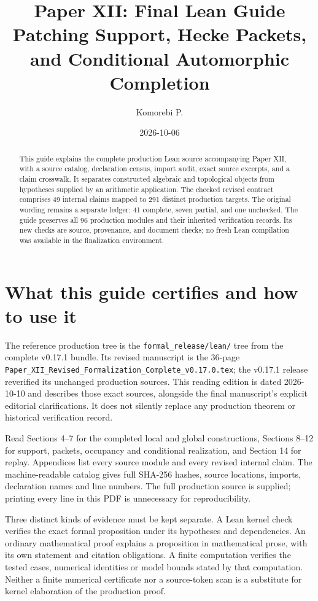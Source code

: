 \documentclass[11pt]{article}
\title{Paper XII: Final Lean Guide\\\large Patching Support, Hecke Packets, and Conditional Automorphic Completion}
\author{Komorebi P.}\date{2026-10-06}
\newcommand{\code}[1]{\nolinkurl{#1}}
\begin{document}
\KomorebiCover


\relax
\begin{abstract}
This guide explains the complete production Lean source accompanying Paper XII, with a source catalog, declaration census, import audit, exact source excerpts, and a claim crosswalk. It separates constructed algebraic and topological objects from hypotheses supplied by an arithmetic application. The checked revised contract comprises 49 internal claims mapped to 291 distinct production targets. The original wording remains a separate ledger: 41 complete, seven partial, and one unchecked. The guide preserves all 96 production modules and their inherited verification records. Its new checks are source, provenance, and document checks; no fresh Lean compilation was available in the finalization environment.
\end{abstract}
{\setlength{\parskip}{0pt}\linespread{1.0}\selectfont\tableofcontents}
\newpage

\section{What this guide certifies and how to use it}
The reference production tree is the \code{formal_release/lean/} tree from the complete v0.17.1 bundle. Its revised manuscript is the 36-page \code{Paper_XII_Revised_Formalization_Complete_v0.17.0.tex}; the v0.17.1 release reverified its unchanged production sources. This reading edition is dated 2026-10-10 and describes those exact sources, alongside the final manuscript's explicit editorial clarifications. It does not silently replace any production theorem or historical verification record.

Read Sections 4--7 for the completed local and global constructions, Sections 8--12 for support, packets, occupancy and conditional realization, and Section 14 for replay. Appendices list every source module and every revised internal claim. The machine-readable catalog gives full SHA-256 hashes, source locations, imports, declaration names and line numbers. The full production source is supplied; printing every line in this PDF is unnecessary for reproducibility.

Three distinct kinds of evidence must be kept separate. A Lean kernel check verifies the exact formal proposition under its hypotheses and dependencies. An ordinary mathematical proof explains a proposition in mathematical prose, with its own statement and citation obligations. A finite computation verifies the tested cases, numerical identities or model bounds stated by that computation. Neither a finite numerical certificate nor a source-token scan is a substitute for kernel elaboration of the production proof.
\end{document}
